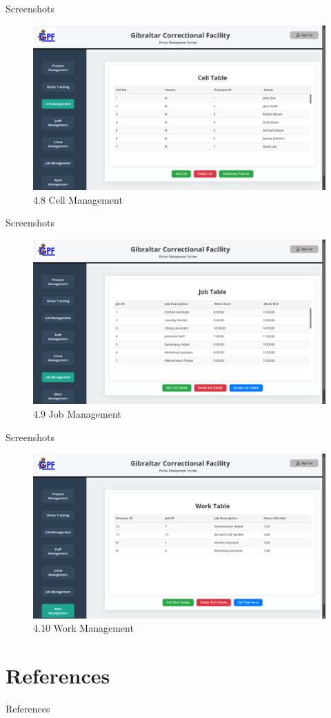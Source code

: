 \documentclass[aspectratio=169]{beamer}
\begin{document}
\begin{frame}{Screenshots}
    \begin{figure}
        \centering
        \includegraphics[width=0.6\linewidth]{cell.png}
        \caption{4.8 Cell Management}
        \label{fig:cell}
    \end{figure}
\end{frame}
\begin{frame}{Screenshots}
    \begin{figure}
        \centering
        \includegraphics[width=0.6\linewidth]{job.png}
        \caption{4.9 Job Management}
        \label{fig:job}
    \end{figure}
\end{frame}
\begin{frame}{Screenshots}
    \begin{figure}
        \centering
        \includegraphics[width=0.6\linewidth]{work.png}
        \caption{4.10 Work Management}
        \label{fig:work}
    \end{figure}
\end{frame}

\section{References}
\begin{frame}{References}
    \printbibliography
    
\end{frame}
\end{document}
